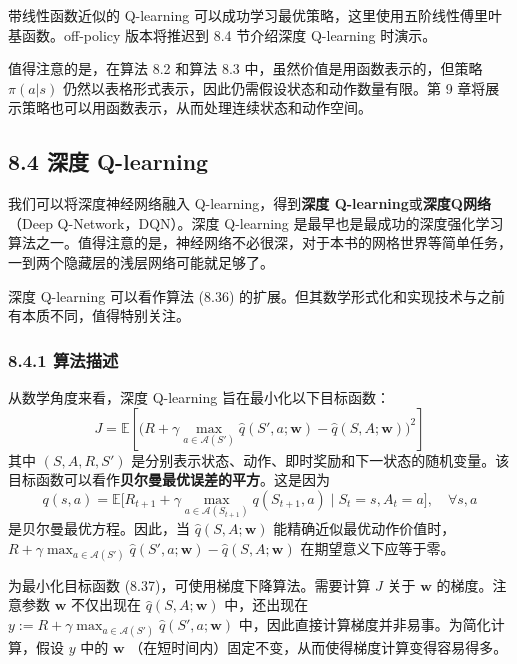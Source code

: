 \documentclass[UTF8]{article}
\begin{document}
带线性函数近似的 Q-learning 可以成功学习最优策略，这里使用五阶线性傅里叶基函数。off-policy 版本将推迟到 8.4 节介绍深度 Q-learning 时演示。

值得注意的是，在算法 8.2 和算法 8.3 中，虽然价值是用函数表示的，但策略 $\pi(a|s)$ 仍然以表格形式表示，因此仍需假设状态和动作数量有限。第 9 章将展示策略也可以用函数表示，从而处理连续状态和动作空间。

\subsection*{8.4 深度 Q-learning}

我们可以将深度神经网络融入 Q-learning，得到\textbf{深度 Q-learning}或\textbf{深度Q网络}（Deep Q-Network，DQN）。深度 Q-learning 是最早也是最成功的深度强化学习算法之一。值得注意的是，神经网络不必很深，对于本书的网格世界等简单任务，一到两个隐藏层的浅层网络可能就足够了。

深度 Q-learning 可以看作算法 (8.36) 的扩展。但其数学形式化和实现技术与之前有本质不同，值得特别关注。

\subsubsection*{8.4.1 算法描述}

从数学角度来看，深度 Q-learning 旨在最小化以下目标函数：
\begin{equation}
\label{eq:dqn_obj}
J = \mathbb{E}\left[\Big(R + \gamma \max_{a \in \mathcal{A}(S')} \hat{q}(S', a; \boldsymbol{w}) - \hat{q}(S, A; \boldsymbol{w})\Big)^2\right]
\end{equation}
其中 $(S, A, R, S')$ 是分别表示状态、动作、即时奖励和下一状态的随机变量。该目标函数可以看作\textbf{贝尔曼最优误差的平方}。这是因为
\[
q(s, a) = \mathbb{E}\Big[R_{t+1} + \gamma \max_{a \in \mathcal{A}(S_{t+1})} q(S_{t+1}, a) \;\Big|\; S_t = s, A_t = a\Big], \quad \forall s, a
\]
是贝尔曼最优方程。因此，当 $\hat{q}(S, A; \boldsymbol{w})$ 能精确近似最优动作价值时，$R + \gamma \max_{a \in \mathcal{A}(S')} \hat{q}(S', a; \boldsymbol{w}) - \hat{q}(S, A; \boldsymbol{w})$ 在期望意义下应等于零。

为最小化目标函数 (8.37)，可使用梯度下降算法。需要计算 $J$ 关于 $\boldsymbol{w}$ 的梯度。注意参数 $\boldsymbol{w}$ 不仅出现在 $\hat{q}(S, A; \boldsymbol{w})$ 中，还出现在 $y := R + \gamma \max_{a \in \mathcal{A}(S')} \hat{q}(S', a; \boldsymbol{w})$ 中，因此直接计算梯度并非易事。为简化计算，假设 $y$ 中的 $\boldsymbol{w}$ （在短时间内）固定不变，从而使得梯度计算变得容易得多。
\end{document}
